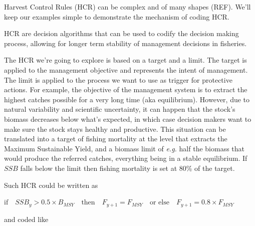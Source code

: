 \documentclass[
]{book}
\begin{document}
Harvest Control Rules (HCR) can be complex and of many shapes (REF). We'll keep our examples simple to demonstrate the mechanism of coding HCR.

HCR are decision algorithms that can be used to codify the decision making process, allowing for longer term stability of management decisions in fisheries.

The HCR we're going to explore is based on a target and a limit. The target is applied to the management objective and represents the intent of management. The limit is applied to the process we want to use as trigger for protective actions. For example, the objective of the management system is to extract the highest catches possible for a very long time (aka equilibrium). However, due to natural variability and scientific uncertainty, it can happen that the stock's biomass decreases below what's expected, in which case decision makers want to make sure the stock stays healthy and productive. This situation can be translated into a target of fishing mortality at the level that extracts the Maximum Sustainable Yield, and a biomass limit of \emph{e.g.} half the biomass that would produce the referred catches, everything being in a stable equilibrium. If \(SSB\) falls below the limit then fishing mortality is set at 80\% of the target.

Such HCR could be written as

\(\text{if} \quad SSB_y > 0.5 \times B_{MSY} \quad \text{then} \quad F_{y+1} = F_{MSY} \quad \text{or else} \quad F_{y+1} = 0.8 \times F_{MSY}\)

and coded like
\end{document}
